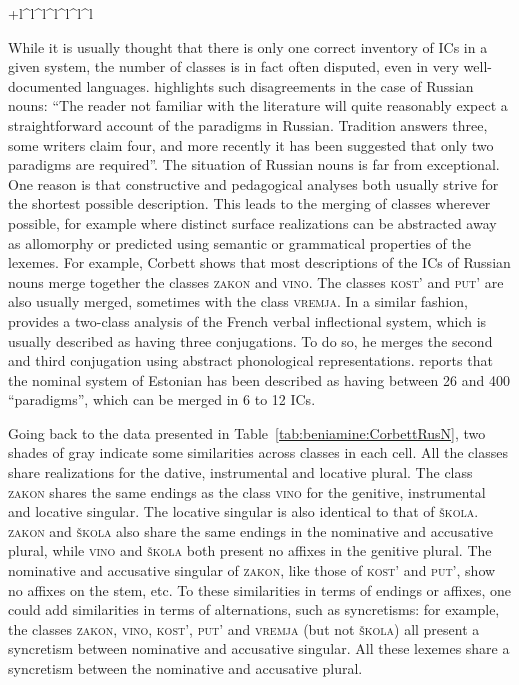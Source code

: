 \documentclass[output=paper]{langscibook}
\begin{document}
\begin{table}
\begin{tabular}{+l^l^l^l^l^l^l}
            \lspbottomrule
        \end{tabular}

        \caption{Six broad inflection classes of Russian in Roman transliteration, according to~\citet[203]{Corbett1982} }
        \label{tab:beniamine:CorbettRusN}
    \end{table}

    While it is usually thought that there is only one correct inventory of ICs in a given system, the number of classes is in fact often disputed, even in very well-documented languages. \citet[202]{Corbett1982} highlights such disagreements in the case of Russian nouns: ``The reader not familiar with the literature will quite reasonably expect a straightforward account of the paradigms in Russian. Tradition answers three, some writers claim four, and more recently it has been suggested that only two paradigms are required''. The situation of Russian nouns is far from exceptional. One reason is that constructive and pedagogical analyses both usually strive for the shortest possible description. This leads to the merging of classes wherever possible, for example where distinct surface realizations can be abstracted away as allomorphy or predicted using semantic or grammatical properties of the lexemes. For example, Corbett shows that most descriptions of the ICs of Russian nouns merge together the classes \textsc{zakon} and \textsc{vino}. The classes \textsc{kost'} and \textsc{put'} are also usually merged, sometimes with the class \textsc{vremja}. In a similar fashion, \citet{Plenat87} provides a two-class analysis of the French verbal inflectional system, which is usually described as having three conjugations. To do so, he merges the second and third conjugation using abstract phonological representations. \citet{Blevins2004} reports that the nominal system of Estonian has been described as having between 26 and 400 ``paradigms'', which can be merged in 6 to 12 ICs.\largerpage

    Going back to the data presented in Table~\ref{tab:beniamine:CorbettRusN}, two shades of gray indicate some similarities across classes in each cell. All the classes share realizations for the dative, instrumental and locative plural. The class \textsc{zakon} shares the same endings as the class \textsc{vino} for the genitive, instrumental and locative singular. The locative singular is also identical to that of \textsc{škola}. \textsc{zakon} and \textsc{škola} also share the same endings in the nominative and accusative plural, while \textsc{vino} and \textsc{škola} both present no affixes in the genitive plural. The nominative and accusative singular of \textsc{zakon}, like those of \textsc{kost'} and \textsc{put'}, show no affixes on the stem, etc. To these similarities in terms of endings or affixes, one could add similarities in terms of alternations, such as syncretisms: for example, the classes \textsc{zakon}, \textsc{vino}, \textsc{kost'}, \textsc{put'} and \textsc{vremja} (but not \textsc{škola}) all present a syncretism between nominative and accusative singular. All these lexemes share a syncretism between the nominative and accusative plural.
\end{document}
